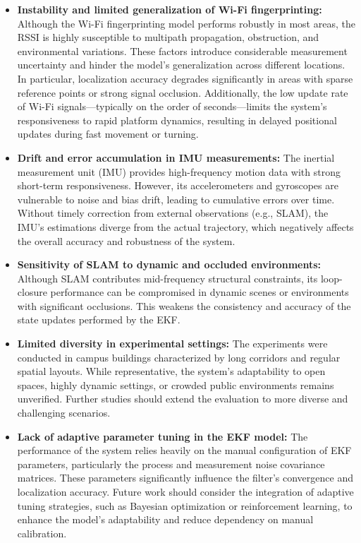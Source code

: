 \documentclass[12pt,a4paper]{article}
\numberwithin{equation}{section}
\begin{document}
\begin{itemize}
\item \textbf{Instability and limited generalization of Wi-Fi fingerprinting:}
  Although the Wi-Fi fingerprinting model performs robustly in most areas, the
  RSSI is highly susceptible to multipath propagation, obstruction, and
  environmental variations. These factors introduce considerable measurement
  uncertainty and hinder the model’s generalization across different
  locations. In particular, localization accuracy degrades significantly in
  areas with sparse reference points or strong signal occlusion. Additionally,
  the low update rate of Wi-Fi signals—typically on the order of
  seconds—limits the system’s responsiveness to rapid platform dynamics,
  resulting in delayed positional updates during fast movement or turning.

\item \textbf{Drift and error accumulation in IMU measurements:} The inertial
  measurement unit (IMU) provides high-frequency motion data with strong
  short-term responsiveness. However, its accelerometers and gyroscopes are
  vulnerable to noise and bias drift, leading to cumulative errors over
  time. Without timely correction from external observations (e.g., SLAM), the
  IMU's estimations diverge from the actual trajectory, which negatively
  affects the overall accuracy and robustness of the system.

\item \textbf{Sensitivity of SLAM to dynamic and occluded environments:}
  Although SLAM contributes mid-frequency structural constraints, its
  loop-closure performance can be compromised in dynamic scenes or environments
  with significant occlusions. This weakens the consistency and accuracy of the
  state updates performed by the EKF.

\item \textbf{Limited diversity in experimental settings:} The experiments were
  conducted in campus buildings characterized by long corridors and regular
  spatial layouts. While representative, the system’s adaptability to open
  spaces, highly dynamic settings, or crowded public environments remains
  unverified. Further studies should extend the evaluation to more diverse and
  challenging scenarios.

\item \textbf{Lack of adaptive parameter tuning in the EKF model:} The
  performance of the system relies heavily on the manual configuration of EKF
  parameters, particularly the process and measurement noise covariance
  matrices. These parameters significantly influence the filter’s convergence
  and localization accuracy. Future work should consider the integration of
  adaptive tuning strategies, such as Bayesian optimization or reinforcement
  learning, to enhance the model’s adaptability and reduce dependency on manual
  calibration.
\end{itemize}
\end{document}
